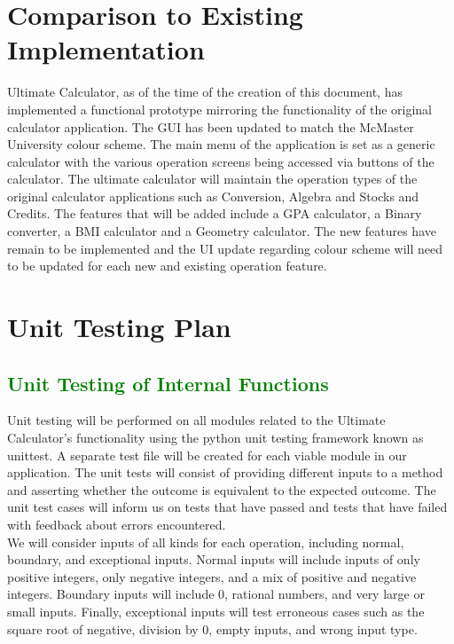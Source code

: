 \documentclass[12pt, titlepage]{article}
\begin{document}
\section{Comparison to Existing Implementation}	
Ultimate Calculator, as of the time of the creation of this document, has implemented a functional prototype mirroring the functionality of the original calculator application. The GUI has been updated to match the McMaster University colour scheme. The main menu of the application is set as a generic calculator with the various operation screens being accessed via buttons of the calculator. The ultimate calculator will maintain the operation types of the original calculator applications such as Conversion, Algebra and Stocks and Credits. The features that will be added include a GPA calculator, a Binary converter, a BMI calculator and a Geometry calculator. The new features have remain to be implemented and the UI update regarding colour scheme will need to be updated for each new and existing operation feature. 
				
\section{Unit Testing Plan}
		
\subsection{\textcolor{Green}{Unit Testing of Internal Functions}}
Unit testing will be performed on all modules related to the Ultimate Calculator's functionality using the python unit testing framework known as unittest. A separate test file will be created for each viable module in our application. The unit tests will consist of providing different inputs to a method and asserting whether the outcome is equivalent to the expected outcome. The unit test cases will inform us on tests that have passed and tests that have failed with feedback about errors encountered.\\

\noindent{}We will consider inputs of all kinds for each operation, including normal, boundary, and exceptional inputs. Normal inputs will include inputs of only positive integers, only negative integers, and a mix of positive and negative integers. Boundary inputs will include 0, rational numbers, and very large or small inputs. Finally, exceptional inputs will test erroneous cases such as the square root of negative, division by 0, empty inputs, and wrong input type.\\
\end{document}
